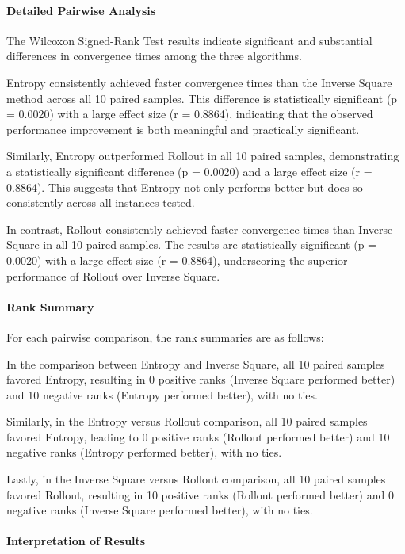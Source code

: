 \documentclass[../report.tex]{subfiles}
\begin{document}
    \paragraph{Detailed Pairwise Analysis}

    The Wilcoxon Signed-Rank Test results indicate significant and substantial differences in convergence times among the three algorithms.

    Entropy consistently achieved faster convergence times than the Inverse Square method across all 10 paired samples. This difference is statistically significant (p = 0.0020) with a large 
    effect size (r = 0.8864), indicating that the observed performance improvement is both meaningful and practically significant.

    Similarly, Entropy outperformed Rollout in all 10 paired samples, demonstrating a statistically significant difference (p = 0.0020) and a large effect size (r = 0.8864). This suggests that 
    Entropy not only performs better but does so consistently across all instances tested.

    In contrast, Rollout consistently achieved faster convergence times than Inverse Square in all 10 paired samples. The results are statistically significant (p = 0.0020) with a large effect 
    size (r = 0.8864), underscoring the superior performance of Rollout over Inverse Square.

    \paragraph{Rank Summary}

    For each pairwise comparison, the rank summaries are as follows:

    In the comparison between Entropy and Inverse Square, all 10 paired samples favored Entropy, resulting in 0 positive ranks (Inverse Square performed better) and 10 negative ranks (Entropy 
    performed better), with no ties.

    Similarly, in the Entropy versus Rollout comparison, all 10 paired samples favored Entropy, leading to 0 positive ranks (Rollout performed better) and 10 negative ranks (Entropy performed 
    better), with no ties.

    Lastly, in the Inverse Square versus Rollout comparison, all 10 paired samples favored Rollout, resulting in 10 positive ranks (Rollout performed better) and 0 negative ranks (Inverse Square 
    performed better), with no ties.

    \paragraph{Interpretation of Results}
\end{document}
